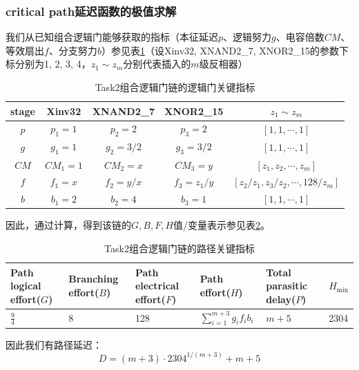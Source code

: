 \documentclass[UTF8,12pt,a4paper]{ctexart}
\begin{document}
\subsubsection{critical path延迟函数的极值求解}

我们从已知组合逻辑门能够获取的指标（本征延迟$p$、逻辑努力$g$、电容倍数$CM$、等效扇出$f$、分支努力$b$）参见表\ref{tab:task2_metrics}（设Xinv32, XNAND2\_7, XNOR2\_15的参数下标分别为1, 2, 3, 4，$z_1 \sim z_m$分别代表插入的$m$级反相器）

\begin{table}[htbp]
    \centering
    \caption{Task2组合逻辑门链的逻辑门关键指标}
    \label{tab:task2_metrics}
    \begin{tabular}{ccccc}
    \toprule
    stage & Xinv32 & XNAND2\_7 & XNOR2\_15 & $z_1 \sim z_m$ \\
    \midrule
    $p$ & $p_1 = 1$ & $p_2 = 2$ & $p_3 = 2$ & $[1,1,\cdots ,1]$ \\
    $g$ & $g_1 = 1$ & $g_2 = 3/2$ & $g_3 = 3/2$ & $[1,1,\cdots ,1]$ \\
    $CM$ & $CM_1 = 1$ & $CM_2 = x$ & $CM_3 = y$ & $[z_1, z_2, \cdots, z_m]$ \\
    $f$ & $f_1 = x$ & $f_2 = y/x$ & $f_3 = z_{1}/y$ & $[z_{2}/z_{1}, z_{3}/z_{2}, \cdots, 128/z_{m}]$ \\
    $b$ & $b_1 = 2$ & $b_2 = 4$ & $b_3 = 1$ & $[1,1,\cdots ,1]$ \\
    \bottomrule
    \end{tabular}
\end{table}

因此，通过计算，得到该链的$G,B,F,H$值/变量表示参见表\ref{tab:task2_path_metrics}。

\begin{table}[htbp]
    \centering
    \caption{Task2组合逻辑门链的路径关键指标}
    \label{tab:task2_path_metrics}
    \begin{tabularx}{\linewidth}{XXXXXX}
    \toprule
    Path logical effort($G$) & Branching effort($B$) &
    Path electrical effort($F$) & Path effort($H$) &
    Total parasitic delay($P$) & $H_{\text{min}}$ \\
    \midrule
    $\frac{9}{4}$ & 8 & 128 & $\sum_{i=1}^{m+3}{g_i f_i b_i}$ & $m+5$ & 2304  \\
    \bottomrule
    \end{tabularx}
\end{table}

因此我们有路径延迟：
$$D = (m+3) \cdot 2304^{1/(m+3)} + m + 5$$
\end{document}
